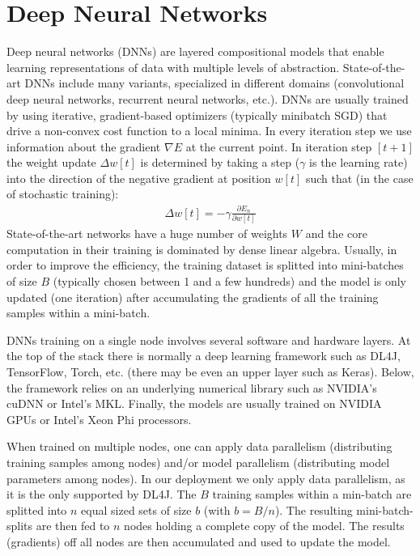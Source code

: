 \documentclass[journal]{IEEEtran}
\begin{document}
\section{Deep Neural Networks}
\label{sec:spark}

Deep neural networks (DNNs) are layered compositional models that enable learning representations of data with multiple levels of abstraction. State-of-the-art DNNs include many variants, specialized in different domains (convolutional deep neural networks, recurrent neural networks, etc.). DNNs are usually trained by using iterative, gradient-based optimizers (typically minibatch SGD) that drive a non-convex cost function to a local minima. In every iteration step we use information about the gradient $\nabla E$ at the current point. In iteration step $[t + 1]$ the weight update $\Delta w[t]$ is determined by taking a step ($\gamma$ is the learning rate) into the direction of the negative gradient at position $w[t]$ such that (in the case of stochastic training):
\begin{align}
\Delta w[t] = - \gamma \frac{\partial E_n}{\partial w[t]}
\end{align}
State-of-the-art networks have a huge number of weights $W$ and the core computation in their training is dominated by dense linear algebra. Usually, in order to improve the efficiency, the training dataset is splitted into mini-batches of size $B$ (typically chosen between 1 and a few hundreds) and the model is only updated (one iteration) after accumulating the gradients of all the training samples within a mini-batch.

DNNs training on a single node involves several software and hardware layers. At the top of the stack there is normally a deep learning framework such as DL4J, TensorFlow, Torch, etc. (there may be even an upper layer such as Keras). Below, the framework relies on an underlying numerical library such as NVIDIA's cuDNN or Intel's MKL. Finally, the models are usually trained on NVIDIA GPUs or Intel's Xeon Phi processors. 

When trained on multiple nodes, one can apply data parallelism (distributing training samples among nodes) and/or model parallelism (distributing model parameters among nodes). In our deployment we only apply data parallelism, as it is the only supported by DL4J. The $B$ training samples within a min-batch are splitted into $n$ equal sized sets of size $b$ (with $b = B/n$). The resulting mini-batch-splits are then fed to $n$ nodes holding a complete copy of the model. The results (gradients) off all nodes are then accumulated and used to update the model.
\end{document}
